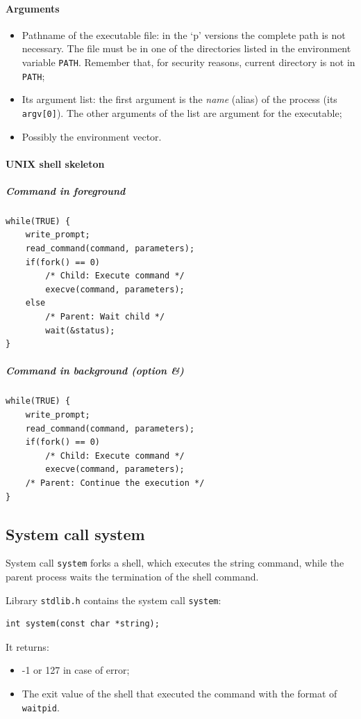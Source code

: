 \paragraph{Arguments}
\begin{itemize}
\item Pathname of the executable file: in the `p' versions the complete path is not necessary. The file must be in one of the directories listed in the environment variable \texttt{PATH}. Remember that, for security reasons, current directory is not in \texttt{PATH};
\item Its argument list: the first argument is the \textit{name} (alias) of the process (its \texttt{argv[0]}). The other arguments of the list are argument for the executable;
\item Possibly the environment vector.
\end{itemize}

\paragraph{UNIX shell skeleton}
\subparagraph{Command in foreground}
\begin{verbatim}
while(TRUE) {
    write_prompt;
    read_command(command, parameters);
    if(fork() == 0)
        /* Child: Execute command */
        execve(command, parameters);
    else
        /* Parent: Wait child */
        wait(&status);
}
\end{verbatim}

\subparagraph{Command in background (option \&)}
\begin{verbatim}
while(TRUE) {
    write_prompt;
    read_command(command, parameters);
    if(fork() == 0)
        /* Child: Execute command */
        execve(command, parameters);
    /* Parent: Continue the execution */
}
\end{verbatim}

\subsection{System call system}
System call \texttt{system} forks a shell, which executes the string command, while the parent process waits the termination of the shell command.

Library \texttt{stdlib.h} contains the system call \texttt{system}:
\begin{verbatim}
int system(const char *string);
\end{verbatim}

It returns:
\begin{itemize}
\item -1 or 127 in case of error;
\item The exit value of the shell that executed the command with the format of \texttt{waitpid}.
\end{itemize}

